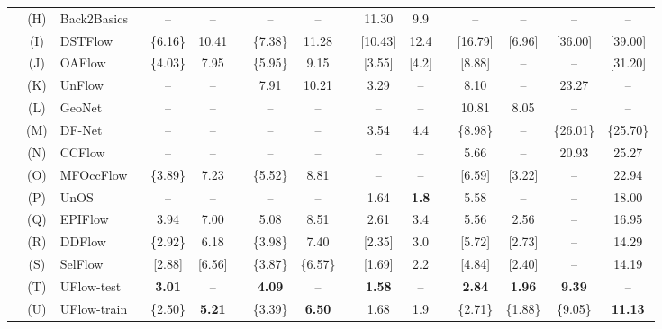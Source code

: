 \documentclass[runningheads]{llncs}
\begin{document}
\begin{table}[t]
{\begin{tabular}{lcl cc c cc c cc c cccc}
        &(H)& Back2Basics \cite{jjyu2016unsupflow} & -- & -- && -- & -- && 11.30 & 9.9 && -- & -- & -- & -- \\ &(I)& DSTFlow \cite{ren2017unsupervised} & \{6.16\} & 10.41 && \{7.38\} & 11.28 && [10.43] & 12.4 && [16.79] & [6.96] & [36.00] & [39.00]\\ &(J)& OAFlow \cite{wang2018occlusion}& \{4.03\} & 7.95 && \{5.95\} & 9.15 && [3.55] & [4.2]  && [8.88] & -- & -- & [31.20] \\ &(K)& UnFlow \cite{meister2018unflow} & -- & -- && 7.91 & 10.21 && 3.29 & -- && 8.10 &--& 23.27 & --\\ &(L)& GeoNet \cite{yin2018geonet}~ &--&--&&--&-- && --&--&& 10.81 & 8.05 &-- & --\\  &(M)& DF-Net \cite{zou2018dfnet}~& -- & -- && -- & -- && 3.54 & 4.4 && \{8.98\} & -- & \{26.01\} & \{25.70\}\\ &(N)& CCFlow \cite{ranjan2019cvpr}~ &--&--&&--&-- &&--&-- && 5.66 &-- & 20.93 & 25.27 \\ &(O)& MFOccFlow \cite{Janai2018ECCV}~ & \{3.89\} & 7.23 && \{5.52\} & 8.81 && --& --&& [6.59] & [3.22] & -- & 22.94\\ &(P) & UnOS \cite{wang2018unos}~ &--&--&&--&-- && 1.64 & {\bf 1.8} && 5.58 & -- & -- & 18.00\\ &(Q)& EPIFlow \cite{Zhong2019UnsupervisedDE} & 3.94 & 7.00 && 5.08 & 8.51 && 2.61 & 3.4 && 5.56 & 2.56 & -- & 16.95 \\ &(R)& DDFlow \cite{DDFlow} & \{2.92\} & 6.18 && \{3.98\} & 7.40 && [2.35] & 3.0 && [5.72] & [2.73] & -- & 14.29 \\ &(S)& SelFlow \cite{SelFlow}~ & [2.88] & [6.56] && \{3.87\} & \{6.57\} && [1.69] & 2.2 && [4.84] & [2.40] & -- & 14.19  \\ \rowcolor{lightyellow} & (T) & UFlow-test & {\bf 3.01} & -- && {\bf 4.09} & -- && {\bf 1.58} & -- && {\bf 2.84} & {\bf 1.96} & {\bf 9.39} & -- \\
        \rowcolor{lightyellow} & (U) & UFlow-train & \{2.50\} & {\bf 5.21} && \{3.39\} & {\bf 6.50} && 1.68 & 1.9 && \{2.71\} & \{1.88\} & \{9.05\} & {\bf 11.13} \\
        \bottomrule
	\end{tabular}}
\end{table}
\end{document}

